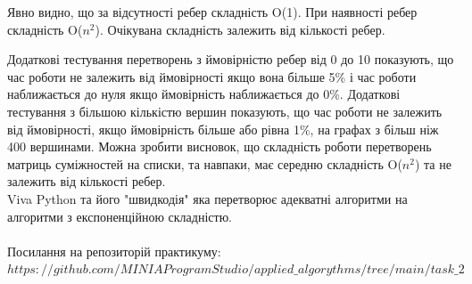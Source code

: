 \documentclass{article}
\begin{document}
Явно видно, що за відсутності ребер складність O(1). При наявності ребер складність O($n^2$). Очікувана складність залежить від кількості ребер.\\\indent

Додаткові тестування перетворень з ймовірністю ребер від 0 до 10 показують, що час роботи не залежить від ймовірності якщо вона більше 5\% і час роботи наближається до нуля якщо ймовірність наближається до 0\%. Додаткові тестування з більшою кількістю вершин показують, що час роботи не залежить від ймовірності, якщо ймовірність більше або рівна 1\%, на графах з більш ніж 400 вершинами. Можна зробити висновок, що складність роботи перетворень матриць суміжностей на списки, та навпаки, має середню складність O($n^2$) та не залежить від кількості ребер. \\\indent
 Viva Python та його "швидкодія" яка перетворює адекватні алгоритми на алгоритми з експоненційною складністю.\\\\\indent
Посилання на репозиторій практикуму:\\ \href{$https://github.com/MINIAProgramStudio/applied_algorythms/tree/main/task_2$}{$https://github.com/MINIAProgramStudio/applied\_algorythms/tree/main/task\_2$}\sloppy
\end{document}
